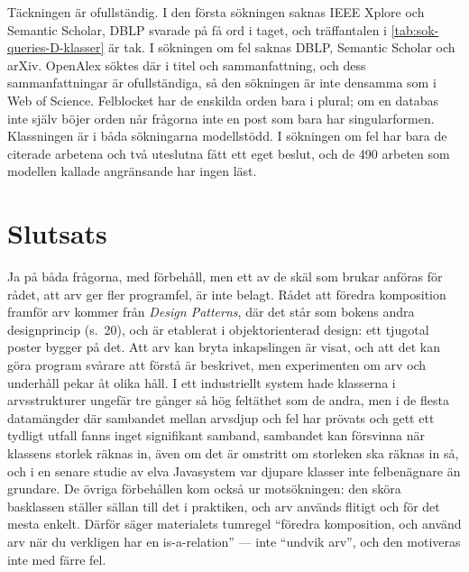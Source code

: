Täckningen är ofullständig.  I den första sökningen saknas IEEE Xplore
och Semantic Scholar, DBLP svarade på få ord i taget, och träffantalen i
\cref{tab:sok-queries-D-klasser} är tak.  I sökningen om fel saknas
DBLP, Semantic Scholar och arXiv.  OpenAlex söktes där i titel och
sammanfattning, och dess sammanfattningar är ofullständiga, så den
sökningen är inte densamma som i Web of Science.  Felblocket har de
enskilda orden bara i plural; om en databas inte själv böjer orden når
frågorna inte en post som bara har singularformen.  Klassningen är i
båda sökningarna modellstödd.  I sökningen om fel har bara de citerade
arbetena och två uteslutna fått ett eget beslut, och de 490 arbeten som
modellen kallade angränsande har ingen läst.

\section{Slutsats}
\label{sec:komp-slutsats}

Ja på båda frågorna, med förbehåll, men ett av de skäl som brukar
anföras för rådet, att arv ger fler programfel, är inte belagt.  Rådet att
föredra komposition framför arv kommer från \emph{Design Patterns}, där det
står som bokens andra designprincip (s.~20), och är etablerat i
objektorienterad design: ett tjugotal poster bygger på det.  Att arv kan
bryta inkapslingen är visat\autocite{Snyder1986}, och att det kan göra
program svårare att förstå är beskrivet\autocite{WildeHuitt1992}, men
experimenten om arv och underhåll pekar åt olika
håll\autocite{Daly1996,Harrison2000}.  I ett industriellt system hade
klasserna i arvsstrukturer ungefär tre gånger så hög feltäthet som de
andra\autocite{CartwrightShepperd2000}, men i de flesta datamängder där
sambandet mellan arvsdjup och fel har prövats och gett ett tydligt
utfall fanns inget signifikant samband\autocite{Jabangwe2015SLR},
sambandet kan försvinna när klassens storlek räknas
in\autocite{ElEmam2001Confounding}, även om det är omstritt om storleken
ska räknas in så\autocite{Evanco2003Comments}, och i en senare studie av
elva
Javasystem var djupare klasser inte felbenägnare än
grundare\autocite{Counsell2021WhereBugs}.  De övriga förbehållen kom också
ur motsökningen: den sköra basklassen ställer sällan till det i
praktiken\autocite{Sabane2017}, och arv används flitigt och för det mesta
enkelt\autocite{StevensonWood2018}.  Därför säger materialets tumregel
\enquote{föredra komposition, och använd arv när du verkligen har en
\foreignlanguage{english}{is-a}-relation} --- inte \enquote{undvik arv},
och den motiveras inte med färre fel.

